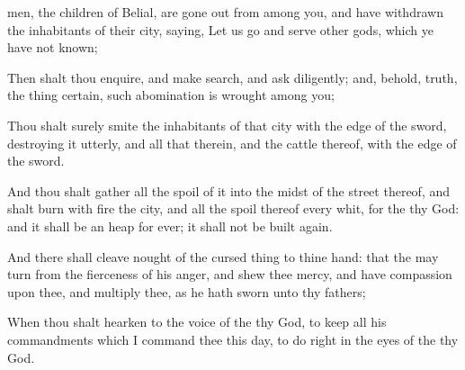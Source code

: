 {
men, the
children of
Belial, are gone
out from
among you, and have
withdrawn the
inhabitants of their
city,
saying, Let us
go and
serve
other
gods, which ye have not
known;

Then shalt thou
enquire, and make
search, and
ask
diligently; and, behold,
{}
truth,
{} the
thing
certain,
{}
such
abomination is
wrought
among you;

Thou shalt
surely
smite the
inhabitants of that
city with the
edge of the
sword, destroying it
utterly, and all that
{} therein, and the
cattle thereof, with the
edge of the
sword.

And thou shalt
gather all the
spoil of it into the
midst of the
street thereof, and shalt
burn with
fire the
city, and all the
spoil thereof every
whit, for the
{} thy
God: and it shall be an
heap for
ever; it shall not be built
again.

And there shall
cleave
nought of the cursed
thing to thine
hand: that the
{} may
turn from the
fierceness of his
anger, and
shew thee
mercy, and have
compassion upon thee, and
multiply thee, as he hath
sworn unto thy
fathers;

When thou shalt
hearken to the
voice of the
{} thy
God, to
keep all his
commandments which I
command thee this
day, to
do
{}
right in the
eyes of the
{} thy
God.




\par }
